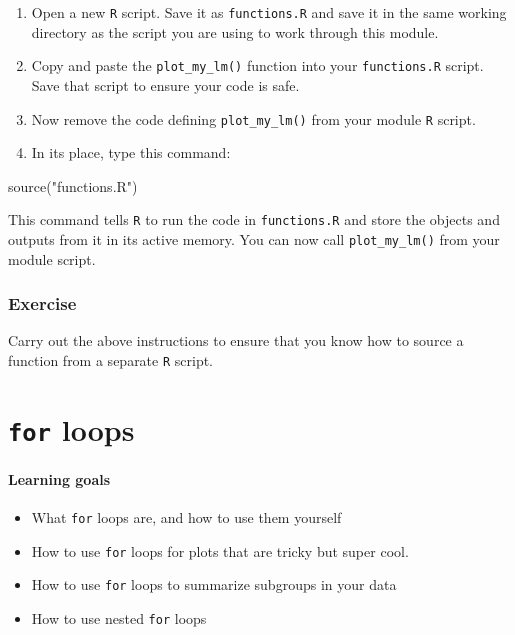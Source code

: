 \documentclass[
]{book}
\newenvironment{Shaded}{\begin{snugshade}}{\end{snugshade}}
\newcommand{\FunctionTok}[1]{\textcolor[rgb]{0.00,0.00,0.00}{#1}}
\newcommand{\NormalTok}[1]{#1}
\newcommand{\StringTok}[1]{\textcolor[rgb]{0.31,0.60,0.02}{#1}}
\providecommand{\tightlist}{%
  \setlength{\itemsep}{0pt}\setlength{\parskip}{0pt}}
\begin{document}
\begin{enumerate}
\def\labelenumi{\arabic{enumi}.}
\item
  Open a new \texttt{R} script. Save it as \texttt{functions.R} and save it in the same working directory as the script you are using to work through this module.
\item
  Copy and paste the \texttt{plot\_my\_lm()} function into your \texttt{functions.R} script. Save that script to ensure your code is safe.
\item
  Now remove the code defining \texttt{plot\_my\_lm()} from your module \texttt{R} script.
\item
  In its place, type this command:
\end{enumerate}

\begin{Shaded}
\begin{Highlighting}[]
\FunctionTok{source}\NormalTok{(}\StringTok{"functions.R"}\NormalTok{)}
\end{Highlighting}
\end{Shaded}

This command tells \texttt{R} to run the code in \texttt{functions.R} and store the objects and outputs from it in its active memory. You can now call \texttt{plot\_my\_lm()} from your module script.

\hypertarget{exercise-7}{%
\subsection*{Exercise}\label{exercise-7}}

Carry out the above instructions to ensure that you know how to source a function from a separate \texttt{R} script.

\hypertarget{for-loops}{%
\chapter{\texorpdfstring{\texttt{for} loops}{for loops}}\label{for-loops}}

\hypertarget{learning-goals-16}{%
\subsubsection*{Learning goals}\label{learning-goals-16}}

\begin{itemize}
\tightlist
\item
  What \texttt{for} loops are, and how to use them yourself
\item
  How to use \texttt{for} loops for plots that are tricky but super cool.
\item
  How to use \texttt{for} loops to summarize subgroups in your data
\item
  How to use nested \texttt{for} loops
\end{itemize}
\end{document}
